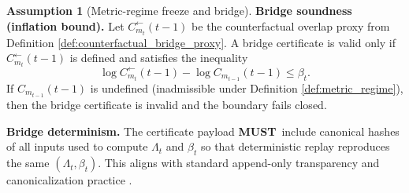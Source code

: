 \documentclass[11pt,a4paper]{article}
\newcommand{\MUST}{\textbf{MUST}}
\theoremstyle{definition}
\newtheorem{assumption}{Assumption}
\theoremstyle{remark}
\begin{document}
\begin{assumption}[Metric-regime freeze and bridge]
\noindent\textbf{Bridge soundness (inflation bound).}
Let $C^{\leftarrow}_{m_t}(t-1)$ be the counterfactual overlap proxy from Definition \ref{def:counterfactual_bridge_proxy}.
A bridge certificate is valid only if $C^{\leftarrow}_{m_t}(t-1)$ is defined and satisfies the inequality
\[
\log C^{\leftarrow}_{m_t}(t-1)-\log C_{m_{t-1}}(t-1)\le \beta_t.
\]
If $C_{m_{t-1}}(t-1)$ is undefined (inadmissible under Definition \ref{def:metric_regime}), then the bridge certificate is invalid and the boundary fails closed.

\noindent\textbf{Bridge determinism.}
The certificate payload \MUST\ include canonical hashes of all inputs used to compute $\Lambda_t$ and $\beta_t$ so that deterministic replay reproduces the same $(\Lambda_t,\beta_t)$.
This aligns with standard append-only transparency and canonicalization practice \cite{HaberStornetta1991,RFC6962,RFC8785}.
\end{assumption}
\end{document}
